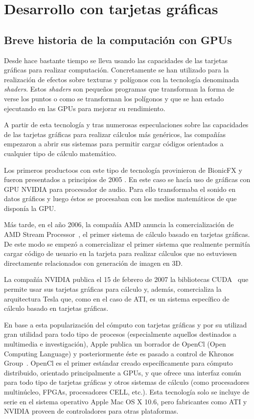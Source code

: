 \chapter{Desarrollo con tarjetas gráficas}\label{cap3}

\section{Breve historia de la computación con GPUs}

Desde hace bastante tiempo se lleva usando las capacidades de las tarjetas gráficas para realizar computación. Concretamente se han utilizado para la realización de efectos sobre texturas y polígonos con la tecnología denominada \emph{shaders}. Estos \emph{shaders} son pequeños programas que transforman la forma de verse los puntos o como se transforman los polígonos y que se han estado ejecutando en las GPUs para mejorar su rendimiento.

A partir de esta tecnología y tras numerosas especulaciones sobre las capacidades de las tarjetas gráficas para realizar cálculos más genéricos, las compañías empezaron a abrir sus sistemas para permitir cargar códigos orientados a cualquier tipo de cálculo matemático.

Los primeros productoos con este tipo de tecnología provinieron de BionicFX y fueron presentados a principios de 2005 \cite{website:extremetech_gpu_audio}. En este caso se hacía uso de gráficas con GPU NVIDIA para procesador de audio. Para ello transformaba el sonido en datos gráficos y luego éstos se procesaban con los medios matemáticos de que disponía la GPU.

Más tarde, en el año 2006, la compañía AMD anuncia la comercialización de AMD Stream Processor~\cite{website:amd_press_stream}, el primer sistema de cálculo basado en tarjetas gráficas. De este modo se empezó a comercializar el primer sistema que realmente permitía cargar código de usuario en la tarjeta para realizar cálculos que no estuviesen directamente relacionados con generación de imagen en 3D.

La compañía NVIDIA publica el 15 de febrero de 2007 la bibliotecas CUDA~\cite{website:nvidia_press_cuda} que permite usar sus tarjetas gráficas para cálculo y, además, comercializa la arquitectura Tesla que, como en el caso de ATI, es un sistema específico de cálculo basado en tarjetas gráficas.

En base a esta popularización del cómputo con tarjetas gráficas y por  su utilizad gran utilidad para todo tipo de procesos (especialmente aquellos destinados a multimedia e investigación), Apple publica un borrador de OpenCl (Open Computing Language) y posteriormente éste es pasado a control de Khronos Group~\cite{website:khronos_press_opencl}. OpenCl es  el primer estándar creado específicamente para cómputo distribuido, orientado principalmente a GPUs, y que ofrece una interfaz común para todo tipo de tarjetas gráficas y otros sistemas de cálculo (como procesadores multinúcleo, FPGAs, procesadores CELL, etc.). Esta tecnología solo se incluye de serie en el sistema operativo Apple Mac OS X 10.6, pero fabricantes como ATI y NVIDIA proveen de controladores para otras plataformas.


